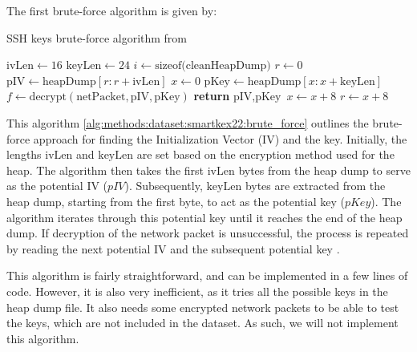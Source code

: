     The first brute-force algorithm is given by:

    \begin{algorithm}[H]\label{alg:methods:dataset:smartkex22:brute_force}
    \caption{SSH keys brute-force algorithm from  \cite{SmartKex22}}
    \begin{algorithmic}[1]
        \State $\text{ivLen} \gets 16$ 
        \State $\text{keyLen} \gets 24$ 
        \State $i \gets \text{sizeof(cleanHeapDump)}$
        \State $r \gets 0$
            \State $\text{pIV} \gets \text{heapDump}[r : r + \text{ivLen}]$
            \State $x \gets 0$
                \State $\text{pKey} \gets \text{heapDump}[x : x + \text{keyLen}]$
                \State $f \gets \text{decrypt}(\text{netPacket}, \text{pIV}, \text{pKey})$
                    \State \textbf{return} $\text{pIV}, \text{pKey}$
                \EndIf
                \State $x \gets x + 8$ 
            \EndWhile
            \State $r \gets x + 8$ 
        \EndWhile
    \EndProcedure
    \end{algorithmic}
    \end{algorithm}
    
    This algorithm \ref{alg:methods:dataset:smartkex22:brute_force} outlines the brute-force approach for finding the Initialization Vector (IV) and the key. Initially, the lengths \(\text{ivLen}\) and \(\text{keyLen}\) are set based on the encryption method used for the heap. The algorithm then takes the first \(\text{ivLen}\) bytes from the heap dump to serve as the potential IV (\(pIV\)). Subsequently, \(\text{keyLen}\) bytes are extracted from the heap dump, starting from the first byte, to act as the potential key (\(pKey\)). The algorithm iterates through this potential key until it reaches the end of the heap dump. If decryption of the network packet is unsuccessful, the process is repeated by reading the next potential IV and the subsequent potential key \cite{SmartKex22}. 

    This algorithm is fairly straightforward, and can be implemented in a few lines of code. However, it is also very inefficient, as it tries all the possible keys in the heap dump file. It also needs some encrypted network packets to be able to test the keys, which are not included in the dataset. As such, we will not implement this algorithm.
    
